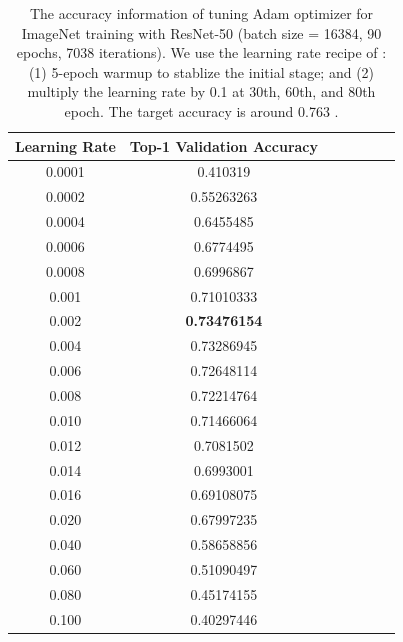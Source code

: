 \begin{table}[ht]
\renewcommand{\arraystretch}{1.3}
\caption{The accuracy information of tuning Adam optimizer for ImageNet training with ResNet-50 (batch size = 16384, 90 epochs, 7038 iterations). We use the learning rate recipe of \citep{goyal2017accurate}: (1) 5-epoch warmup to stablize the initial stage; and (2) multiply the learning rate by 0.1 at 30th, 60th, and 80th epoch. The target accuracy is around 0.763 \citep{goyal2017accurate}.}
\centering
\begin{tabular}{|c|c|c|c|c|c|c|}
\hline
Learning Rate & Top-1 Validation Accuracy\\
\hline
\hline
0.0001 & 0.410319 \\
\hline
0.0002 & 0.55263263 \\
\hline
0.0004 & 0.6455485 \\
\hline
0.0006 & 0.6774495 \\
\hline
0.0008 & 0.6996867 \\
\hline
0.001 & 0.71010333 \\
\hline
0.002 & {\bf 0.73476154} \\
\hline
0.004 & 0.73286945 \\
\hline
0.006 & 0.72648114 \\
\hline
0.008 & 0.72214764 \\
\hline
0.010 & 0.71466064 \\
\hline
0.012 & 0.7081502 \\
\hline
0.014 & 0.6993001 \\
\hline
0.016 & 0.69108075 \\
\hline
0.020 & 0.67997235 \\
\hline
0.040 & 0.58658856 \\
\hline
0.060 & 0.51090497 \\
\hline
0.080 & 0.45174155 \\
\hline
0.100 & 0.40297446 \\
\hline
\end{tabular}
\label{table:imagenet_adam_tuning_2}
\end{table}


